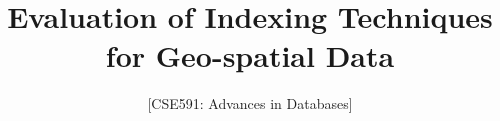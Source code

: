 \documentclass{sig-alternate-05-2015}
\begin{document}






%

\title{Evaluation of Indexing Techniques for Geo-spatial Data}
\subtitle{[CSE591: Advances in Databases]}
%
%
%
%
%
\end{document}
